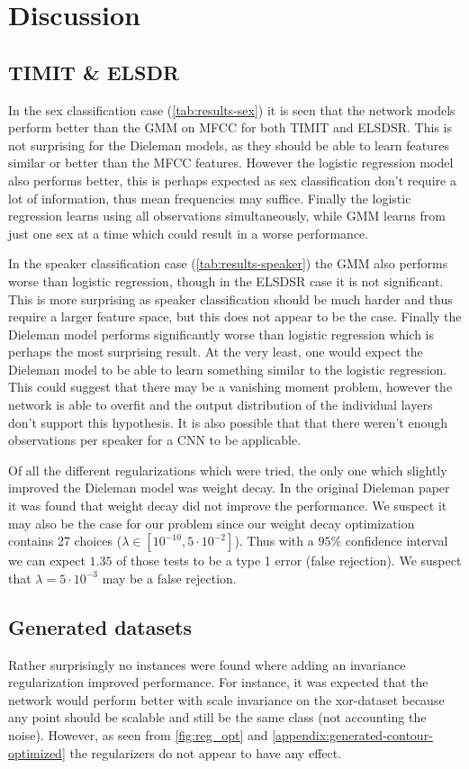 \section{Discussion}
\subsection{TIMIT \& ELSDR}
In the sex classification case (\cref{tab:results-sex}) it is seen that the network models perform better than the GMM on MFCC for both TIMIT and ELSDSR. This is not surprising for the Dieleman models, as they should be able to learn features similar or better than the MFCC features. However the logistic regression model also performs better, this is perhaps expected as sex classification don't require a lot of information, thus mean frequencies may suffice. Finally the logistic regression learns using all observations simultaneously, while GMM learns from just one sex at a time which could result in a worse performance.

In the speaker classification case (\cref{tab:results-speaker}) the GMM also performs worse than logistic regression, though in the ELSDSR case it is not significant. This is more surprising as speaker classification should be much harder and thus require a larger feature space, but this does not appear to be the case. Finally the Dieleman model performs significantly worse than logistic regression which is perhaps the most surprising result. At the very least, one would expect the Dieleman model to be able to learn something similar to the logistic regression. This could suggest that there may be a vanishing moment problem, however the network is able to overfit and the output distribution of the individual layers don't support this hypothesis. It is also possible that that there weren't enough observations per speaker for a CNN to be applicable.

Of all the different regularizations which were tried, the only one which slightly improved the Dieleman model was weight decay. In the original Dieleman paper \cite{dieleman} it was found that weight decay did not improve the performance. We suspect it may also be the case for our problem since our weight decay optimization contains 27 choices ($\lambda \in [10^{-10}, 5 \cdot 10^{-2}]$). Thus with a $95\%$ confidence interval we can expect $1.35$ of those tests to be a type 1 error (false rejection). We suspect that $\lambda = 5 \cdot 10^{-3}$ may be a false rejection.

\subsection{Generated datasets}
Rather surprisingly no instances were found where adding an invariance regularization improved performance. For instance, it was expected that the network would perform better with scale invariance on the xor-dataset because any point should be scalable and still be the same class (not accounting the noise). However, as seen from \cref{fig:reg_opt} and \cref{appendix:generated-contour-optimized} the regularizers do not appear to have any effect.

